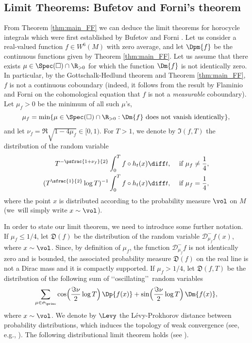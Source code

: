 \subsection{Limit Theorems: Bufetov and Forni's theorem}

From Theorem \ref{thm:main_FF} we can deduce the limit theorems for horocycle integrals which were first established by Bufetov and Forni \cite{BuFo}.
Let us consider a real-valued function $f \in W^6(M)$ with zero average, and let $\Dpm{f}$ be the continuous functions given by Theorem \ref{thm:main_FF}.
Let us assume that there exists $\mu \in \Spec(\square) \cap \R_{>0}$ for which the function $\Dm{f}$ is not identically zero. In particular, by the Gottschalk-Hedlund theorem and Theorem \ref{thm:main_FF}, $f$ is not a continuous coboundary (indeed, it follows from the result by Flaminio and Forni \cite{FlaFo} on the cohomological equation that $f$ is not a \emph{measurable} coboundary).
Let $\mu_f >0$ be the minimum of all such $\mu$'s, \ie
\[
\mu_f = \min \{ \mu \in \Spec(\square) \cap \R_{>0} : \Dm{f} \text{ does not vanish identically}\},
\]
and let $\nu_f = \Re \sqrt{1-4\mu_f} \in [0,1)$.
For $T >1$, we denote by $\mathfrak{I}(f,T)$ the distribution of the random variable
\begin{equation*}
\begin{split}
T^{- \psfrac{1+\nu_f}{2}}\int_0^T f \circ h_t (x) \diff t, &\quad \text{ if } \mu_f \neq \frac{1}{4},\\
(T^{\sfrac{1}{2}} \log T)^{-1} \int_0^T f \circ h_t (x) \diff t, &\quad \text{ if } \mu_f = \frac{1}{4},
\end{split}
\end{equation*}
where the point $x$ is distributed according to the probability measure $\vol$ on $M$ (we~will simply write $x \sim \vol$).

In order to state our limit theorem, we need to introduce some further notation.
If $\mu_f \leq 1/4$, let $\mathfrak{D}(f)$ be the distribution of the random variable $\mathcal{D}^{-}_{\mu_f}f(x)$, where $x \sim \vol$.
Since, by definition of $\mu_f$, the function $\mathcal{D}^{-}_{\mu_f}f$ is not identically zero and is bounded, the associated probability measure $\mathfrak{D}(f)$ on the real line is not a Dirac mass and it is compactly supported.
If $\mu_f > 1/4$, let $\mathfrak{D}(f,T)$ be the distribution of the following sum of \lq\lq oscillating\rq\rq\ random variables
\[
\sum_{\mu \in \sigma_{\princ}} \cos\Bigl(\frac{\Im\nu}{2} \log T \Bigr) \, \Dp{ f(x)} + \sin\Bigl(\frac{\Im\nu}{2} \log T \Bigr) \, \Dm{ f(x)},
\]
where $x \sim \vol$. We denote by $\Levy$ the Lévy-Prokhorov distance between probability distributions, which induces the topology of weak convergence (see, e.g., \cite{Bil}).
The following distributional limit theorem holds (see \cite[Th.\,1.4, 1.5]{BuFo}).


